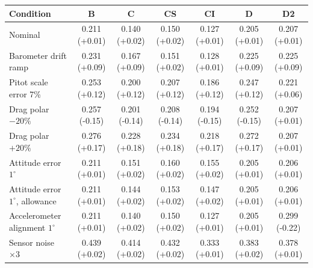 \begin{tabular}{@{}lcccccc@{}}
\toprule
Condition & B & C & CS & CI & D & D2 \\
\midrule
Nominal & 0.211 (+0.01) & 0.140 (+0.02) & 0.150 (+0.02) & 0.127 (+0.01) & 0.205 (+0.01) & 0.207 (+0.01) \\
Barometer drift ramp & 0.231 (+0.09) & 0.167 (+0.09) & 0.151 (+0.02) & 0.128 (+0.01) & 0.225 (+0.09) & 0.225 (+0.09) \\
Pitot scale error 7\% & 0.253 (+0.12) & 0.200 (+0.12) & 0.207 (+0.12) & 0.186 (+0.12) & 0.247 (+0.12) & 0.221 (+0.06) \\
Drag polar $-20\%$ & 0.257 (-0.15) & 0.201 (-0.14) & 0.208 (-0.14) & 0.194 (-0.15) & 0.252 (-0.15) & 0.207 (+0.01) \\
Drag polar $+20\%$ & 0.276 (+0.17) & 0.228 (+0.18) & 0.234 (+0.18) & 0.218 (+0.17) & 0.272 (+0.17) & 0.207 (+0.01) \\
Attitude error $1^\circ$ & 0.211 (+0.01) & 0.151 (+0.02) & 0.160 (+0.02) & 0.155 (+0.02) & 0.205 (+0.01) & 0.206 (+0.01) \\
Attitude error $1^\circ$, allowance & 0.211 (+0.01) & 0.144 (+0.02) & 0.153 (+0.02) & 0.147 (+0.02) & 0.205 (+0.01) & 0.206 (+0.01) \\
Accelerometer alignment $1^\circ$ & 0.211 (+0.01) & 0.140 (+0.02) & 0.150 (+0.02) & 0.127 (+0.01) & 0.205 (+0.01) & 0.299 (-0.22) \\
Sensor noise $\times3$ & 0.439 (+0.02) & 0.414 (+0.02) & 0.432 (+0.02) & 0.333 (+0.01) & 0.383 (+0.02) & 0.378 (+0.01) \\
\bottomrule
\end{tabular}
